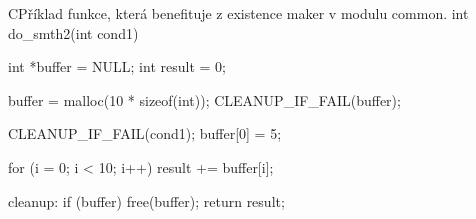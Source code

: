 \begin{code}{C}{Příklad funkce, která benefituje z existence maker v modulu common.}
int do_smth2(int cond1){
  int *buffer = NULL;
  int result = 0;

  buffer = malloc(10 * sizeof(int));
  CLEANUP_IF_FAIL(buffer);

  CLEANUP_IF_FAIL(cond1);
  buffer[0] = 5;

  for (i = 0; i < 10; i++){
    result += buffer[i];
  }

cleanup:
  if (buffer){
    free(buffer);
  }
  return result;
}
\end{code}
